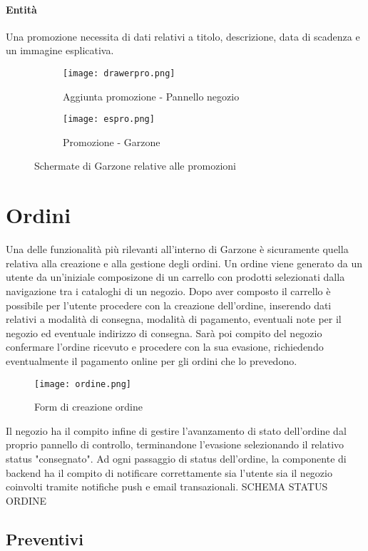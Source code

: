 \paragraph{Entità} Una promozione necessita di dati relativi a titolo, descrizione, data di scadenza e un immagine esplicativa.
\begin{figure}[h!]
    \begin{subfigure}{0.5\textwidth}
    \texttt{[image: drawerpro.png]} 
    \caption{Aggiunta promozione - Pannello negozio}
    \label{fig:subim1}
    \end{subfigure}
    \begin{subfigure}{0.5\textwidth}
    \texttt{[image: espro.png]}
    \caption{Promozione - Garzone}
    \label{fig:subim2}
    \end{subfigure}
    
    \caption{Schermate di Garzone relative alle promozioni}
    \label{fig:image2}
\end{figure}
\section{Ordini}
Una delle funzionalità più rilevanti all'interno di Garzone è sicuramente quella relativa alla creazione e alla gestione degli ordini. Un ordine viene generato da un utente da un'iniziale composizone di un carrello con prodotti selezionati dalla navigazione tra i cataloghi di un negozio. Dopo aver composto il carrello è possibile per l'utente procedere con la creazione dell'ordine, inserendo dati relativi a modalità di consegna, modalità di pagamento, eventuali note per il negozio ed eventuale indirizzo di consegna. Sarà poi compito del negozio confermare l'ordine ricevuto e procedere con la sua evasione, richiedendo eventualmente il pagamento online per gli ordini che lo prevedono. 
\begin{figure}[h!]
    \centering
    \texttt{[image: ordine.png]}
    \caption{Form di creazione ordine}
\end{figure}
Il negozio ha il compito infine di gestire l'avanzamento di stato dell'ordine dal proprio pannello di controllo, terminandone l'evasione selezionando il relativo status "consegnato". Ad ogni passaggio di status dell'ordine, la componente di backend ha il compito di notificare correttamente sia l'utente sia il negozio coinvolti tramite notifiche push e email transazionali. 
SCHEMA STATUS ORDINE
\FloatBarrier
\subsection{Preventivi}
